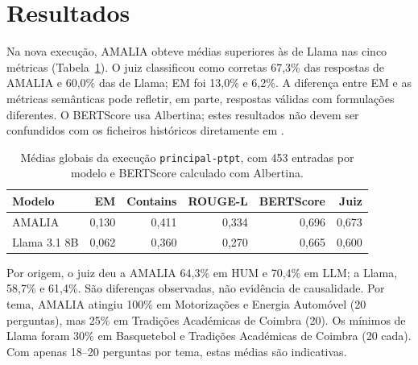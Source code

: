 \section{Resultados}

Na nova execução, AMALIA obteve médias superiores às de Llama nas cinco métricas (Tabela~\ref{tab:resultados-globais}). O juiz classificou como corretas 67,3\% das respostas de AMALIA e 60,0\% das de Llama; EM foi 13,0\% e 6,2\%. A diferença entre EM e as métricas semânticas pode refletir, em parte, respostas válidas com formulações diferentes. O BERTScore usa Albertina; estes resultados não devem ser confundidos com os ficheiros históricos diretamente em .

\begin{table}[ht]
\centering\small
\begin{tabular}{lrrrrr}
\toprule
Modelo & EM & Contains & ROUGE-L & BERTScore & Juiz \\
\midrule
AMALIA & 0,130 & 0,411 & 0,334 & 0,696 & 0,673 \\
Llama 3.1 8B & 0,062 & 0,360 & 0,270 & 0,665 & 0,600 \\
\bottomrule
\end{tabular}
\caption{Médias globais da execução \texttt{principal-ptpt}, com 453 entradas por modelo e BERTScore calculado com Albertina.}
\label{tab:resultados-globais}
\end{table}

Por origem, o juiz deu a AMALIA 64,3\% em HUM e 70,4\% em LLM; a Llama, 58,7\% e 61,4\%. São diferenças observadas, não evidência de causalidade. Por tema, AMALIA atingiu 100\% em Motorizações e Energia Automóvel (20 perguntas), mas 25\% em Tradições Académicas de Coimbra (20). Os mínimos de Llama foram 30\% em Basquetebol e Tradições Académicas de Coimbra (20 cada). Com apenas 18–20 perguntas por tema, estas médias são indicativas.
